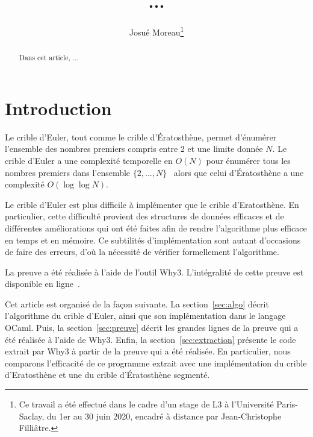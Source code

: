 \documentclass[a4paper]{easychair}
\begin{document}
\title{...}
\author{Josué Moreau\thanks{Ce travail a été effectué dans le cadre
    d'un stage de L3 à l'Université Paris-Saclay, du 1er au 30 juin
    2020, encadré à distance par Jean-Christophe Filliâtre.}}
\maketitle

\begin{abstract}
  Dans cet article, ...
\end{abstract}

\section{Introduction}


Le crible d'Euler, tout comme le crible d'Ératosthène, permet d'énumérer
l'ensemble des nombres premiers compris entre 2 et une limite donnée $N$.
Le crible d'Euler a une complexité temporelle en $O(N)$ pour énumérer tous les
nombres premiers dans l'ensemble $\{2,...,N\}$~\cite{crible-euler} alors que celui
d'Ératosthène a une complexité $O(\log\log N)$.

Le crible d'Euler est plus difficile à implémenter que le crible d'Eratosthène.
En particulier, cette difficulté provient des structures de données efficaces
et de différentes améliorations qui ont été faites afin de rendre l'algorithme
plus efficace en temps et en mémoire.
Ce subtilités d'implémentation sont autant d'occasions de faire des erreurs,
d'où la nécessité de vérifier formellement l'algorithme.

La preuve a été réalisée à l'aide de l'outil Why3.
L'intégralité de cette preuve est disponible en ligne~\cite{mapreuve}.

Cet article est organisé de la façon suivante.
La section~\ref{sec:algo} décrit l'algorithme du crible d'Euler, ainsi que son
implémentation dans le langage OCaml.
Puis, la section~\ref{sec:preuve} décrit les grandes lignes de la preuve qui a été
réalisée à l'aide de Why3.
Enfin, la section~\ref{sec:extraction} présente le code extrait par Why3 à partir
de la preuve qui a été réalisée. En particulier, nous comparons l'efficacité de
ce programme extrait avec une implémentation du crible d'Eratosthène et une du
crible d'Ératosthène segmenté.
\end{document}
